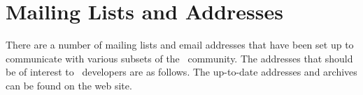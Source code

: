 
\chapter{Mailing Lists and Addresses\label{chap:addresses}}

There are a number of mailing lists and email addresses that have been set
up to communicate with various subsets of the \cgal\ community.  The
addresses that should be of interest to \cgal\ developers are as follows.
The up-to-date addresses and archives can be found on the web site.

